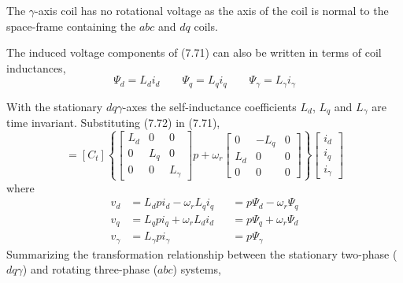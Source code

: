 \documentclass[a4paper,numbers=noenddot,12pt]{scrbook}
\begin{document}
        The $\gamma$-axis coil has no rotational voltage as the axis of the coil is normal to the space-frame containing the $abc$ and $dq$ coils.

        The induced voltage components of (7.71) can also be written in terms of coil inductances,
        \begin{equation}
            \varPsi_d = L_d i_d \qquad \varPsi_q = L_q i_q \qquad \varPsi_{\gamma} = L_{\gamma} i_{\gamma}
            \label{eq:Eq7.72}
        \end{equation}

        With the stationary $dq\gamma$-axes the self-inductance coefficients $L_d$, $L_q$ and $L_{\gamma}$ are time invariant. Substituting (7.72) in (7.71),
        \begin{equation}
            [v_{abc}] = [C_t]
            \left\{ 
                \begin{bmatrix}
                    L_d & 0 & 0 \\
                    0 & L_q & 0 \\
                    0 & 0 & L_{\gamma}
                \end{bmatrix}
                p + \omega_r 
                \begin{bmatrix}
                    0 & -L_q & 0 \\
                    L_d & 0  & 0 \\
                    0 & 0 & 0
                \end{bmatrix}
            \right\}
            \begin{bmatrix}
                i_d \\ i_q \\ i_{\gamma}
            \end{bmatrix}
            \label{eq:Eq7.73}
        \end{equation}
        where
        \begin{equation}
            \begin{aligned}
                v_d & = L_d p i_d - \omega_r L_q i_q && = p \varPsi_d - \omega_r \varPsi_q \\
                v_q & = L_q p i_q + \omega_r L_d i_d && = p \varPsi_q + \omega_r \varPsi_d \\
                v_{\gamma} & = L_{\gamma} p i_{\gamma} && = p \varPsi_{\gamma}
            \end{aligned}
            \label{eq:Eq7.74}
        \end{equation}
        Summarizing the transformation relationship between the stationary two-phase ($d q \gamma$) and rotating three-phase ($abc$) systems,
\end{document}
